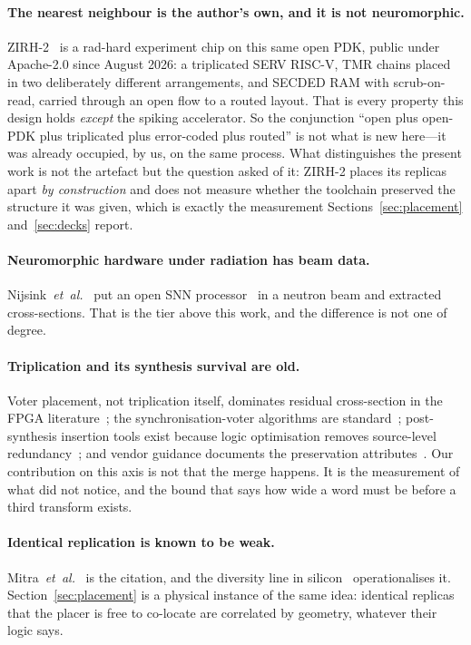 \documentclass[11pt,a4paper]{article}
\begin{document}
\paragraph{The nearest neighbour is the author's own, and it is not
neuromorphic.} ZIRH-2~\cite{zirh2_2026} is a rad-hard experiment chip on
this same open PDK, public under Apache-2.0 since August 2026: a
triplicated SERV RISC-V, TMR chains placed in two deliberately different
arrangements, and SECDED RAM with scrub-on-read, carried through an open
flow to a routed layout. That is every property this design holds
\emph{except} the spiking accelerator. So the conjunction ``open plus
open-PDK plus triplicated plus error-coded plus routed'' is not what is
new here---it was already occupied, by us, on the same process. What
distinguishes the present work is not the artefact but the question
asked of it: ZIRH-2 places its replicas apart \emph{by construction} and
does not measure whether the toolchain preserved the structure it was
given, which is exactly the measurement
Sections~\ref{sec:placement} and~\ref{sec:decks} report.

\paragraph{Neuromorphic hardware under radiation has beam data.}
Nijsink~\emph{et~al.}~\cite{nijsink2026} put an open SNN
processor~\cite{frenkel2019} in a neutron beam and extracted
cross-sections. That is the tier above this work, and the difference is
not one of degree.

\paragraph{Triplication and its synthesis survival are old.}
Voter placement, not triplication itself, dominates residual
cross-section in the FPGA literature~\cite{kastensmidt2005}; the
synchronisation-voter algorithms are standard~\cite{johnson2010};
post-synthesis insertion tools exist because logic optimisation removes
source-level redundancy~\cite{tmrg2017}; and vendor guidance documents
the preservation attributes~\cite{esa_ftmr}. Our contribution on this
axis is not that the merge happens. It is the measurement of what did not
notice, and the bound that says how wide a word must be before a third
transform exists.

\paragraph{Identical replication is known to be weak.}
Mitra~\emph{et~al.}~\cite{mitra2002} is the citation, and the diversity
line in silicon~\cite{safede2021,tcls2016,tcls2019} operationalises it.
Section~\ref{sec:placement} is a physical instance of the same idea:
identical replicas that the placer is free to co-locate are correlated by
geometry, whatever their logic says.
\end{document}
